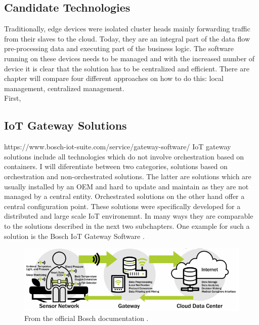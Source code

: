 \subsection{Candidate Technologies}
Traditionally, edge devices were isolated cluster heads mainly forwarding traffic from their slaves to the cloud. Today, they are an integral part of the data flow pre-processing data and executing part of the business logic. The software running on these devices needs to be managed and with the increased number of device it is clear that the solution has to be centralized and efficient. There are  chapter will compare four different approaches on how to do this: local management, centralized management. \\
First,

\subsection{IoT Gateway Solutions}
https://www.bosch-iot-suite.com/service/gateway-software/
IoT gateway solutions include all technologies which do not involve orchestration based on containers. I will diferentiate between two categories, solutions based on orchestration and non-orchestrated solutions. The latter are solutions which are usually installed by an OEM and hard to update and maintain as they are not managed by a central entity. Orchestrated solutions on the other hand offer a central configuration point. These solutions were specifically developed for a distributed and large scale IoT environemnt. In many ways they are comparable to the solutions described in the next two subchapters. One example for such a solution is the Bosch IoT Gateway Software \cite{BoschIoT13:online}.

\begin{figure}[h!]
    \centering
    \includegraphics[scale=1.8]{figures/iotSetup.png}
    \caption{From the official Bosch documentation \cite{BoschIoT13:online}.}
    \label{fig:boschIoTGatewaySetup}
\end{figure}






